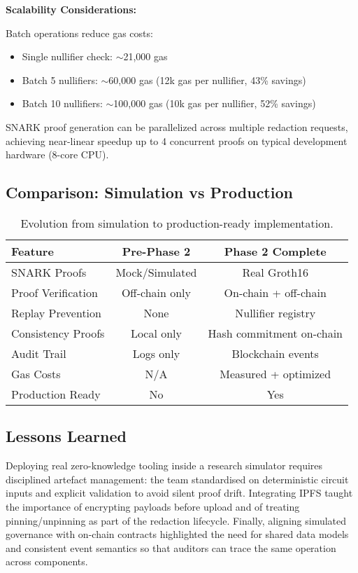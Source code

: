 \textbf{Scalability Considerations:}

Batch operations reduce gas costs:
\begin{itemize}
    \item Single nullifier check: $\sim$21,000 gas
    \item Batch 5 nullifiers: $\sim$60,000 gas (12k gas per nullifier, 43\% savings)
    \item Batch 10 nullifiers: $\sim$100,000 gas (10k gas per nullifier, 52\% savings)
\end{itemize}

SNARK proof generation can be parallelized across multiple redaction requests, achieving near-linear speedup up to 4 concurrent proofs on typical development hardware (8-core CPU).

\subsection{Comparison: Simulation vs Production}

\begin{table}[h]
\centering
\begin{tabular}{lcc}
\toprule
\textbf{Feature} & \textbf{Pre-Phase 2} & \textbf{Phase 2 Complete} \\
\midrule
SNARK Proofs & Mock/Simulated & Real Groth16 \\
Proof Verification & Off-chain only & On-chain + off-chain \\
Replay Prevention & None & Nullifier registry \\
Consistency Proofs & Local only & Hash commitment on-chain \\
Audit Trail & Logs only & Blockchain events \\
Gas Costs & N/A & Measured + optimized \\
Production Ready & No & Yes \\
\bottomrule
\end{tabular}
\caption{Evolution from simulation to production-ready implementation.}
\label{tab:simulation_vs_production}
\end{table}

\subsection{Lessons Learned}
Deploying real zero-knowledge tooling inside a research simulator requires disciplined artefact management: the team standardised on deterministic circuit inputs and explicit validation to avoid silent proof drift. Integrating IPFS taught the importance of encrypting payloads before upload and of treating pinning/unpinning as part of the redaction lifecycle. Finally, aligning simulated governance with on-chain contracts highlighted the need for shared data models and consistent event semantics so that auditors can trace the same operation across components.
